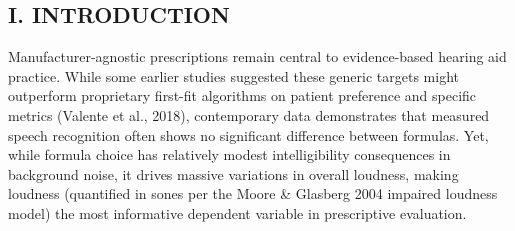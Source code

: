 \documentclass[
  12pt,
]{article}
\begin{document}
\subsection{I. INTRODUCTION}\label{i.-introduction}

Manufacturer-agnostic prescriptions remain central to evidence-based
hearing aid practice. While some earlier studies suggested these generic
targets might outperform proprietary first-fit algorithms on patient
preference and specific metrics (Valente et al., 2018), contemporary
data demonstrates that measured speech recognition often shows no
significant difference between formulas. Yet, while formula choice has
relatively modest intelligibility consequences in background noise, it
drives massive variations in overall loudness, making loudness
(quantified in sones per the Moore \& Glasberg 2004 impaired loudness
model) the most informative dependent variable in prescriptive
evaluation.
\end{document}

